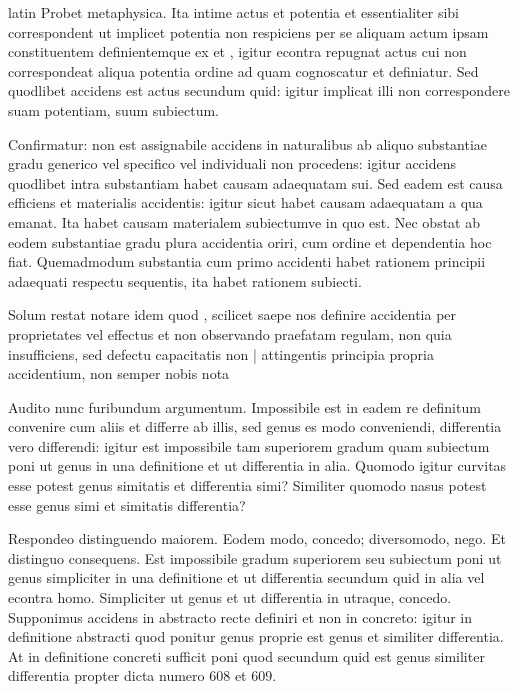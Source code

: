 \begin{otherlanguage*}{latin}
\pstart
Probet metaphysica. Ita intime actus et potentia et essentialiter sibi correspondent ut implicet potentia non respiciens per se aliquam actum ipsam constituentem definientemque ex  et , igitur econtra repugnat actus cui non correspondeat aliqua potentia ordine ad quam cognoscatur et definiatur. Sed quodlibet accidens est actus secundum quid:
igitur implicat illi non correspondere suam potentiam, suum subiectum. 
\pend

\pstart
Confirmatur:
non est assignabile accidens in naturalibus ab aliquo substantiae gradu generico vel specifico vel individuali non procedens:
igitur accidens quodlibet intra substantiam habet causam adaequatam sui. Sed eadem est causa efficiens et materialis accidentis:
igitur sicut habet causam adaequatam a qua emanat. Ita habet causam materialem subiectumve in quo est. Nec obstat ab eodem substantiae gradu plura accidentia oriri, cum ordine et dependentia hoc fiat. Quemadmodum substantia cum primo accidenti habet rationem principii adaequati respectu sequentis, ita habet rationem subiecti. 
\pend

\pstart
Solum restat notare idem quod , scilicet saepe nos definire accidentia per proprietates vel effectus et non observando praefatam regulam, non quia insufficiens, sed defectu capacitatis non \textnormal{|} attingentis principia propria accidentium, non semper nobis nota 
\pend

\pstart
Audito nunc furibundum argumentum. Impossibile est in eadem re definitum convenire cum aliis et differre ab illis, sed genus es modo conveniendi, differentia vero differendi:
igitur est impossibile tam superiorem gradum quam subiectum poni ut genus in una definitione et ut differentia in alia. Quomodo igitur curvitas esse potest genus simitatis et differentia simi? Similiter quomodo nasus potest esse genus simi et simitatis differentia? 
\pend

\pstart
Respondeo distinguendo maiorem. Eodem modo, concedo; diversomodo, nego. Et distinguo consequens. Est impossibile gradum superiorem seu subiectum poni ut genus simpliciter in una definitione et ut differentia secundum quid in alia vel econtra homo. Simpliciter ut genus et ut differentia in utraque, concedo. Supponimus accidens in abstracto recte definiri et non in concreto:
igitur in definitione abstracti quod ponitur genus proprie est genus et similiter differentia. At in definitione concreti sufficit poni quod secundum quid est genus similiter differentia propter dicta numero 608 et 609. 
\pend


\end{otherlanguage*}

